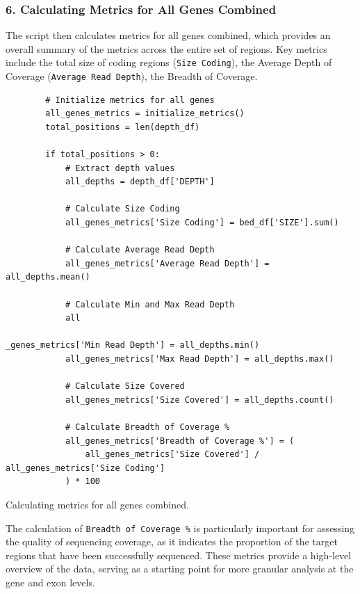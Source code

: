 \subsubsection{\textbf{6. Calculating Metrics for All Genes Combined}}

The script then calculates metrics for all genes combined, which provides an overall summary of the metrics across the entire set of regions. Key metrics include the total size of coding regions (\texttt{Size Coding}), the Average Depth of Coverage (\texttt{Average Read Depth}), the Breadth of Coverage.

\begin{longlisting}
\begin{verbatim}
        # Initialize metrics for all genes
        all_genes_metrics = initialize_metrics()
        total_positions = len(depth_df)

        if total_positions > 0:
            # Extract depth values
            all_depths = depth_df['DEPTH']

            # Calculate Size Coding
            all_genes_metrics['Size Coding'] = bed_df['SIZE'].sum()

            # Calculate Average Read Depth
            all_genes_metrics['Average Read Depth'] = all_depths.mean()
            
            # Calculate Min and Max Read Depth
            all

_genes_metrics['Min Read Depth'] = all_depths.min()
            all_genes_metrics['Max Read Depth'] = all_depths.max()

            # Calculate Size Covered
            all_genes_metrics['Size Covered'] = all_depths.count()

            # Calculate Breadth of Coverage %
            all_genes_metrics['Breadth of Coverage %'] = (
                all_genes_metrics['Size Covered'] / all_genes_metrics['Size Coding']
            ) * 100
\end{verbatim}
\caption{Calculating metrics for all genes combined.}
\label{lbl:metrics_all_genes}
\end{longlisting}

The calculation of \texttt{Breadth of Coverage \%} is particularly important for assessing the quality of sequencing coverage, as it indicates the proportion of the target regions that have been successfully sequenced. These metrics provide a high-level overview of the data, serving as a starting point for more granular analysis at the gene and exon levels.

